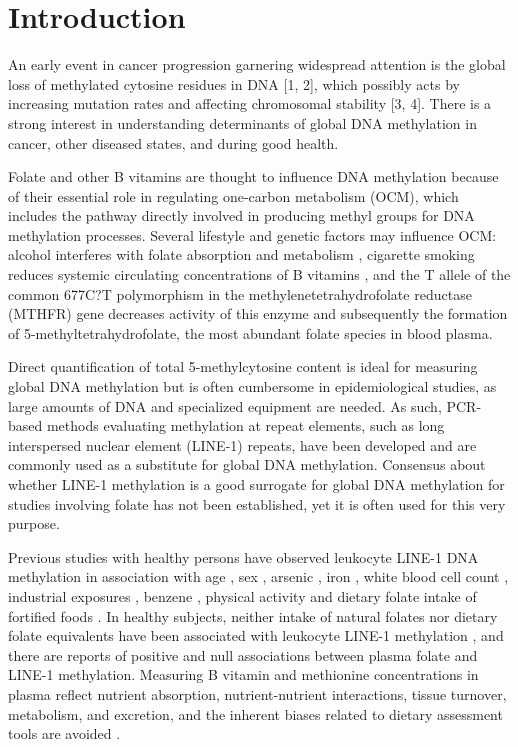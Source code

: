 \newpage

\section{Introduction} %
An early event in cancer progression garnering widespread attention is the global loss of methylated cytosine residues in DNA [1, 2], which possibly acts by increasing mutation rates and affecting chromosomal stability [3, 4]. There is a strong interest in understanding determinants of global DNA methylation in cancer, other diseased states, and during good health.

Folate and other B vitamins are thought to influence DNA methylation because of their essential role in regulating one-carbon metabolism (OCM), which includes the pathway directly involved in producing methyl groups for DNA methylation processes. Several lifestyle and genetic factors may influence OCM:  alcohol interferes with folate absorption and metabolism \cite{c35}, cigarette smoking reduces systemic circulating concentrations of B vitamins \cite{c36}, and the T allele of the common 677C?T polymorphism in the methylenetetrahydrofolate reductase (MTHFR) gene decreases activity of this enzyme and subsequently the formation of 5-methyltetrahydrofolate, the most abundant folate species in blood plasma.

Direct quantification of total 5-methylcytosine content is ideal for measuring global DNA methylation but is often cumbersome in epidemiological studies, as large amounts of DNA and specialized equipment are needed. As such, PCR-based methods evaluating methylation at repeat elements, such as long interspersed nuclear element (LINE-1) repeats, have been developed and are commonly used as a substitute for global DNA methylation. Consensus about whether LINE-1 methylation is a good surrogate for global DNA methylation for studies involving folate has not been established, yet it is often used for this very purpose.

Previous studies with healthy persons have observed leukocyte LINE-1 DNA methylation in association with age \cite{c37,c38,c39}, sex \cite{c310,c313}, arsenic \cite{c311}, iron \cite{c311}, white blood cell count \cite{c310}, industrial exposures \cite{c314}, benzene \cite{c315}, physical activity \cite{c316} and dietary folate intake of fortified foods \cite{c317}. In healthy subjects, neither intake of natural folates nor dietary folate equivalents have been associated with leukocyte LINE-1 methylation \cite{c317}, and there are reports of positive \cite{c318} and null associations \cite{c319} between plasma folate and LINE-1 methylation. Measuring B vitamin and methionine concentrations in plasma reflect nutrient absorption, nutrient-nutrient interactions, tissue turnover, metabolism, and excretion, and the inherent biases related to dietary assessment tools are avoided \cite{c320}.

